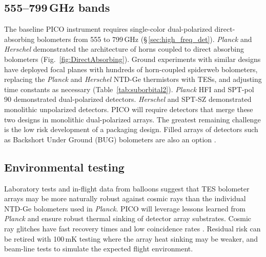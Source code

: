 

\subsection{555--799\,GHz bands}
\label{sec:dev_arrays}

The baseline PICO instrument requires single-color dual-polarized
direct-absorbing bolometers from 555 to 799\,GHz
(\S\,\ref{sec:high_freq_det}).  \textit{Planck} and \textit{Herschel}
demonstrated the architecture of horns coupled to direct absorbing
bolometers (Fig.~\ref{fig:DirectAbsorbing}).  Ground experiments with
similar designs have deployed focal planes with hundreds of
horn-coupled spiderweb bolometers, replacing the \textit{Planck} and
\textit{Herschel} NTD-Ge thermistors with TESs, and adjusting time
constants as necessary (Table~\ref{tab:suborbital2}). \textit{Planck}
HFI and SPT-pol 90 demonstrated dual-polarized
detectors. \textit{Herschel} and SPT-SZ demonstrated monolithic
unpolarized detectors. PICO will require detectors that merge these
two designs in monolithic dual-polarized arrays. The greatest
remaining challenge is the low risk development of a packaging
design. Filled arrays of detectors such as Backshort Under Ground
(BUG) bolometers are also an option \citep{Staguhn2006}.



\subsection{Environmental testing}
\label{sec:env_testing}
Laboratory tests and in-flight data from balloons suggest that TES
bolometer arrays may be more naturally robust against cosmic rays than
the individual NTD-Ge bolometers used in \textit{Planck}. PICO will leverage lessons
learned from \textit{Planck} and ensure robust thermal sinking of
detector array substrates. Cosmic ray
glitches have fast recovery times and low coincidence rates
\citep{SPIDER2018,Filippini_inprep}. Residual risk can be retired with 100\,mK
testing where the array heat sinking may be weaker, and beam-line
tests to simulate the expected flight environment.

